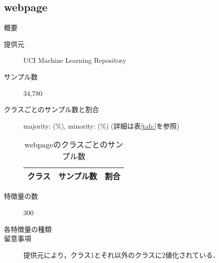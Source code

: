 \subsection{webpage}
\begin{description}
    \item[概要] \cite{webpage}
    \item[提供元] UCI Machine Learning Repository
    \item[サンプル数] 34,780
    \item[クラスごとのサンプル数と割合] majority:  (\%), minority:  (\%) (詳細は表\ref{tab:}を参照)

        \begin{table}[htbp]
            \centering
            \caption{webpageのクラスごとのサンプル数}
            \label{tab:webpage}
            \begin{tabular}{lrc} \hline
                \multicolumn{1}{c}{クラス}&
                \multicolumn{1}{c}{サンプル数}&
                \multicolumn{1}{c}{割合}\\
                \hline
                \hline

                \hline
            \end{tabular}
        \end{table}

    \item[特徴量の数] 300
    \item[各特徴量の種類] \mbox{}
        
    \item[留意事項] 提供元により，クラス1とそれ以外のクラスに2値化されている．
\end{description}



